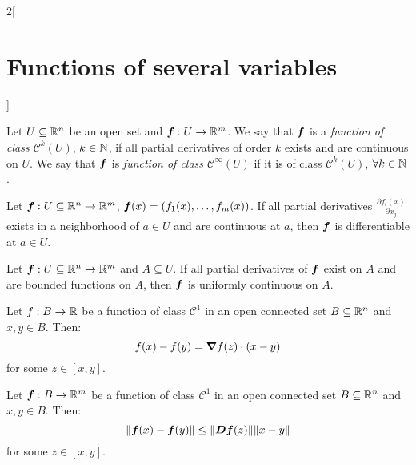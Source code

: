 \documentclass[../../../main.tex]{subfiles}
\begin{document}
\begin{multicols}{2}[\section{Functions of several variables}]
\begin{theorem}
  \end{theorem}
  \begin{definition}
    Let $U\subseteq\mathbb{R}^n$ be an open set and $\boldsymbol{f}:U\rightarrow\mathbb{R}^m$. We say that $\boldsymbol{f}$ is a \textit{function of class $\mathcal{C}^k(U)$}, $k\in\mathbb{N} $, if all partial derivatives of order $k$ exists and are continuous on $U$. We say that $\boldsymbol{f}$ is \textit{function of class $\mathcal{C}^\infty(U)$} if it is of class $\mathcal{C}^k(U)$, $\forall k\in\mathbb{N} $.
  \end{definition}
  \begin{theorem}
    Let $\boldsymbol{f}:U\subseteq\mathbb{R}^n\rightarrow\mathbb{R}^m$, $\boldsymbol{f}(x)=(f_1(x),\ldots,f_m(x))$. If all partial derivatives $\displaystyle \frac{\partial f_i(x)}{\partial x_j}$ exists in a neighborhood of $a\in U$ and are continuous at $a$, then $\boldsymbol{f}$ is differentiable at $a\in U$.
  \end{theorem}
  \begin{prop}
    Let $\boldsymbol{f}:U\subseteq\mathbb{R}^n\rightarrow\mathbb{R}^m$ and $A\subseteq U$. If all partial derivatives of $\boldsymbol{f}$ exist on $A$ and are bounded functions on $A$, then $\boldsymbol{f}$ is uniformly continuous on $A$.
  \end{prop}
  \begin{theorem}
    Let $f:B\rightarrow\mathbb{R} $ be a function of class $\mathcal{C}^1$ in an open connected set $B\subseteq\mathbb{R}^n$ and $x,y\in B$. Then: $$f(x)-f(y)=\grad f(z)\cdot(x-y)$$ for some $z\in[x,y]$.
  \end{theorem}
  \begin{theorem}
    Let $\boldsymbol{f}:B\rightarrow\mathbb{R}^m$ be a function of class $\mathcal{C}^1$ in an open connected set $B\subseteq\mathbb{R}^n$ and $x,y\in B$. Then: $$\|\boldsymbol{f}(x)-\boldsymbol{f}(y)\|\leq\|\boldsymbol{Df}(z)\|\|x-y\|$$ for some $z\in[x,y]$.
  \end{theorem}

\end{multicols}
\end{document}

